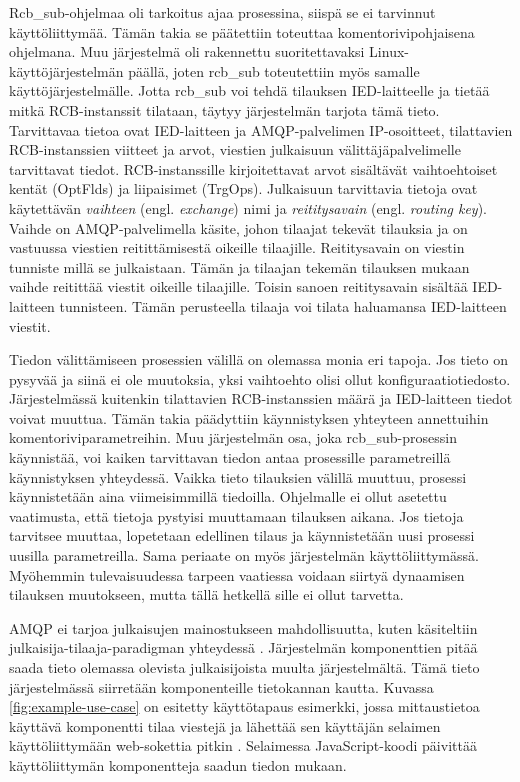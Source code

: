 Rcb\_sub-ohjelmaa oli tarkoitus ajaa prosessina, siispä se ei tarvinnut käyttöliittymää. Tämän takia se päätettiin toteuttaa komentorivipohjaisena ohjelmana. Muu järjestelmä oli rakennettu suoritettavaksi Linux-käyttöjärjestelmän päällä, joten rcb\_sub toteutettiin myös samalle käyttöjärjestelmälle. Jotta rcb\_sub voi tehdä tilauksen IED-laitteelle ja tietää mitkä RCB-instanssit tilataan, täytyy järjestelmän tarjota tämä tieto. Tarvittavaa tietoa ovat IED-laitteen ja AMQP-palvelimen IP-osoitteet, tilattavien RCB-instanssien viitteet ja arvot, viestien julkaisuun välittäjäpalvelimelle tarvittavat tiedot. RCB-instanssille kirjoitettavat arvot sisältävät vaihtoehtoiset kentät (OptFlds) ja liipaisimet (TrgOps). Julkaisuun tarvittavia tietoja ovat käytettävän \emph{vaihteen} (engl. \emph{exchange}) nimi ja \emph{reititysavain} (engl. \emph{routing key}). Vaihde on AMQP-palvelimella käsite, johon tilaajat tekevät tilauksia ja on vastuussa viestien reitittämisestä oikeille tilaajille. Reititysavain on viestin tunniste millä se julkaistaan. Tämän ja tilaajan tekemän tilauksen mukaan vaihde reitittää viestit oikeille tilaajille. Toisin sanoen reititysavain sisältää IED-laitteen tunnisteen. Tämän perusteella tilaaja voi tilata haluamansa IED-laitteen viestit.

Tiedon välittämiseen prosessien välillä on olemassa monia eri tapoja. Jos tieto on pysyvää ja siinä ei ole muutoksia, yksi vaihtoehto olisi ollut konfiguraatiotiedosto. Järjestelmässä kuitenkin tilattavien RCB-instanssien määrä ja IED-laitteen tiedot voivat muuttua. Tämän takia päädyttiin käynnistyksen yhteyteen annettuihin komentoriviparametreihin. Muu järjestelmän osa, joka rcb\_sub-prosessin käynnistää, voi kaiken tarvittavan tiedon antaa prosessille parametreillä käynnistyksen yhteydessä. Vaikka tieto tilauksien välillä muuttuu, prosessi käynnistetään aina viimeisimmillä tiedoilla. Ohjelmalle ei ollut asetettu vaatimusta, että tietoja pystyisi muuttamaan tilauksen aikana. Jos tietoja tarvitsee muuttaa, lopetetaan edellinen tilaus ja käynnistetään uusi prosessi uusilla parametreilla. Sama periaate on myös järjestelmän käyttöliittymässä. Myöhemmin tulevaisuudessa tarpeen vaatiessa voidaan siirtyä dynaamisen tilauksen muutokseen, mutta tällä hetkellä sille ei ollut tarvetta.

AMQP ei tarjoa julkaisujen mainostukseen mahdollisuutta, kuten käsiteltiin julkaisija-tilaaja-paradigman yhteydessä \cite{AMQP-specification}. Järjestelmän komponenttien pitää saada tieto olemassa olevista julkaisijoista muulta järjestelmältä. Tämä tieto järjestelmässä siirretään komponenteille tietokannan kautta. Kuvassa \ref{fig:example-use-case} on esitetty käyttötapaus esimerkki, jossa mittaustietoa käyttävä komponentti tilaa viestejä ja lähettää sen käyttäjän selaimen käyttöliittymään web-sokettia pitkin \cite{websocket}. Selaimessa JavaScript-koodi päivittää käyttöliittymän komponentteja saadun tiedon mukaan.

